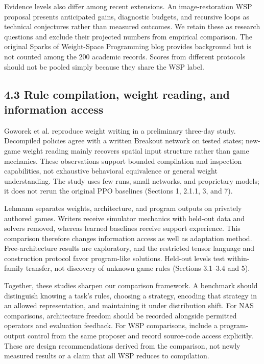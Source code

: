 Evidence levels also differ among recent extensions. An image-restoration WSP proposal presents anticipated gains, diagnostic budgets, and recursive loops as technical conjectures rather than measured outcomes.\cite{r47} We retain these as research questions and exclude their projected numbers from empirical comparison. The original Sparks of Weight-Space Programming blog provides background but is not counted among the 200 academic records. Scores from different protocols should not be pooled simply because they share the WSP label.\cite{r1,r47}


\subsection*{4.3 Rule compilation, weight reading, and information access}

Goworek et al. reproduce weight writing in a preliminary three-day study. Decompiled policies agree with a written Breakout network on tested states; new-game weight reading mainly recovers spatial input structure rather than game mechanics.\cite{r201} These observations support bounded compilation and inspection capabilities, not exhaustive behavioral equivalence or general weight understanding. The study uses few runs, small networks, and proprietary models; it does not rerun the original PPO baselines (Sections 1, 2.1.1, 3, and 7).


Lehmann separates weights, architecture, and program outputs on privately authored games.\cite{r202} Writers receive simulator mechanics with held-out data and solvers removed, whereas learned baselines receive support experience. This comparison therefore changes information access as well as adaptation method. Free-architecture results are exploratory, and the restricted tensor language and construction protocol favor program-like solutions. Held-out levels test within-family transfer, not discovery of unknown game rules (Sections 3.1–3.4 and 5).


Together, these studies sharpen our comparison framework. A benchmark should distinguish knowing a task's rules, choosing a strategy, encoding that strategy in an allowed representation, and maintaining it under distribution shift. For NAS comparisons, architecture freedom should be recorded alongside permitted operators and evaluation feedback. For WSP comparisons, include a program-output control from the same proposer and record source-code access explicitly. These are design recommendations derived from the comparison, not newly measured results or a claim that all WSP reduces to compilation.


